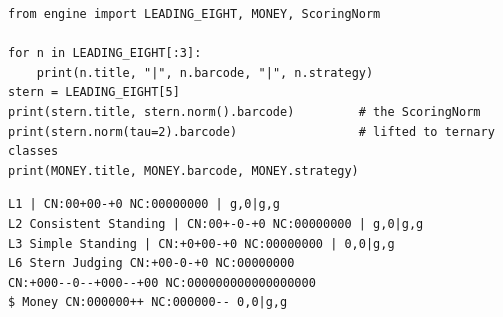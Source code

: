 \begin{lstlisting}[style=code]
from engine import LEADING_EIGHT, MONEY, ScoringNorm

for n in LEADING_EIGHT[:3]:
    print(n.title, "|", n.barcode, "|", n.strategy)
stern = LEADING_EIGHT[5]
print(stern.title, stern.norm().barcode)         # the ScoringNorm
print(stern.norm(tau=2).barcode)                 # lifted to ternary classes
print(MONEY.title, MONEY.barcode, MONEY.strategy)
\end{lstlisting}
\begin{lstlisting}[style=output]
L1 | CN:00+00-+0 NC:00000000 | g,0|g,g
L2 Consistent Standing | CN:00+-0-+0 NC:00000000 | g,0|g,g
L3 Simple Standing | CN:+0+00-+0 NC:00000000 | 0,0|g,g
L6 Stern Judging CN:+00-0-+0 NC:00000000
CN:+000--0--+000--+00 NC:000000000000000000
$ Money CN:000000++ NC:000000-- 0,0|g,g
\end{lstlisting}
